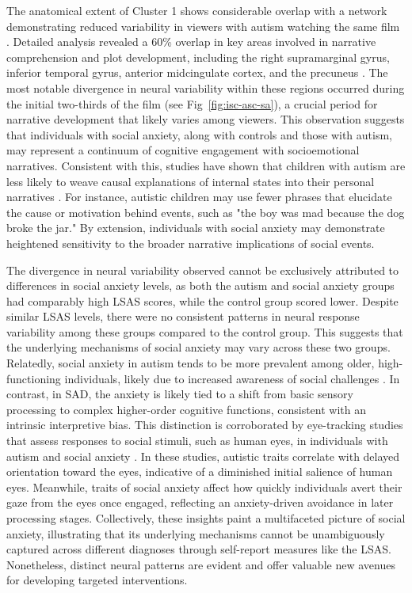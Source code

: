 The anatomical extent of Cluster 1 shows considerable overlap with a network demonstrating reduced variability in viewers with autism watching the same film \citep{mangnus2024bpcnni}. Detailed analysis revealed a 60\% overlap in key areas involved in narrative comprehension and plot development, including the right supramarginal gyrus, inferior temporal gyrus, anterior midcingulate cortex, and the precuneus \citep{jaaskelainen2021,tylen2015}. The most notable divergence in neural variability within these regions occurred during the initial two-thirds of the film (see Fig~\ref{fig:isc-asc-sa}), a crucial period for narrative development that likely varies among viewers. This observation suggests that individuals with social anxiety, along with controls and those with autism, may represent a continuum of cognitive engagement with socioemotional narratives. Consistent with this, studies have shown that children with autism are less likely to weave causal explanations of internal states into their personal narratives \citep{losh2003,tager-flusberg1995}. For instance, autistic children may use fewer phrases that elucidate the cause or motivation behind events, such as "the boy was mad because the dog broke the jar." By extension, individuals with social anxiety may demonstrate heightened sensitivity to the broader narrative implications of social events.

The divergence in neural variability observed cannot be exclusively attributed to differences in social anxiety levels, as both the autism and social anxiety groups had comparably high LSAS scores, while the control group scored lower. Despite similar LSAS levels, there were no consistent patterns in neural response variability among these groups compared to the control group. This suggests that the underlying mechanisms of social anxiety may vary across these two groups. Relatedly, social anxiety in autism tends to be more prevalent among older, high-functioning individuals, likely due to increased awareness of social challenges \citep{white2009}. In contrast, in SAD, the anxiety is likely tied to a shift from basic sensory processing to complex higher-order cognitive functions, consistent with an intrinsic interpretive bias. This distinction is corroborated by eye-tracking studies that assess responses to social stimuli, such as human eyes, in individuals with autism and social anxiety \citep{kleberg2017,ni2023}. In these studies, autistic traits correlate with delayed orientation toward the eyes, indicative of a diminished initial salience of human eyes. Meanwhile, traits of social anxiety affect how quickly individuals avert their gaze from the eyes once engaged, reflecting an anxiety-driven avoidance in later processing stages. Collectively, these insights paint a multifaceted picture of social anxiety, illustrating that its underlying mechanisms cannot be unambiguously captured across different diagnoses through self-report measures like the LSAS. Nonetheless, distinct neural patterns are evident and offer valuable new avenues for developing targeted interventions.


